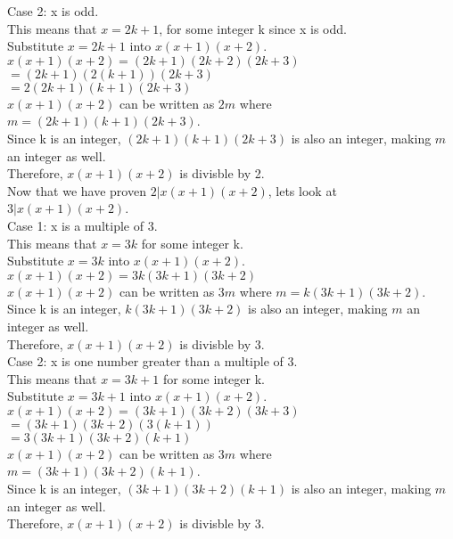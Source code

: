 \documentclass[12pt, oneside]{article}
\begin{document}
\begin{enumerate}
\begin{enumerate}
\begin{description}
        Case 2: x is odd. \\
        This means that $x=2k+1$, for some integer k since x is odd. \\
        Substitute $x=2k+1$ into $x(x+1)(x+2)$. \\
        $x(x+1)(x+2) = (2k+1)(2k+2)(2k+3)$ \\
        $= (2k+1)(2(k+1))(2k+3)$ \\
        $= 2(2k+1)(k+1)(2k+3)$ \\
        $x(x+1)(x+2)$ can be written as $2m$ where $m = (2k+1)(k+1)(2k+3)$. \\
        Since k is an integer, $(2k+1)(k+1)(2k+3)$ is also an integer, making $m$ an integer as well. \\
        Therefore, $x(x+1)(x+2)$ is divisble by 2. \\

        Now that we have proven $2|x(x+1)(x+2)$, lets look at $3|x(x+1)(x+2)$. \\

        Case 1: x is a multiple of 3. \\
        This means that $x=3k$ for some integer k. \\
        Substitute $x=3k$ into $x(x+1)(x+2)$. \\
        $x(x+1)(x+2) = 3k(3k+1)(3k+2)$ \\
        $x(x+1)(x+2)$ can be written as $3m$ where $m = k(3k+1)(3k+2)$. \\
        Since k is an integer, $k(3k+1)(3k+2)$ is also an integer, making $m$ an integer as well. \\
        Therefore, $x(x+1)(x+2)$ is divisble by 3. \\

        Case 2: x is one number greater than a multiple of 3. \\
        This means that $x=3k+1$ for some integer k. \\
        Substitute $x=3k+1$ into $x(x+1)(x+2)$. \\
        $x(x+1)(x+2) = (3k+1)(3k+2)(3k+3)$ \\
        $= (3k+1)(3k+2)(3(k+1))$ \\
        $= 3(3k+1)(3k+2)(k+1)$ \\
        $x(x+1)(x+2)$ can be written as $3m$ where $m = (3k+1)(3k+2)(k+1)$. \\
        Since k is an integer, $(3k+1)(3k+2)(k+1)$ is also an integer, making $m$ an integer as well. \\
        Therefore, $x(x+1)(x+2)$ is divisble by 3. \\


\end{description}
\end{enumerate}
\end{enumerate}
\end{document}
